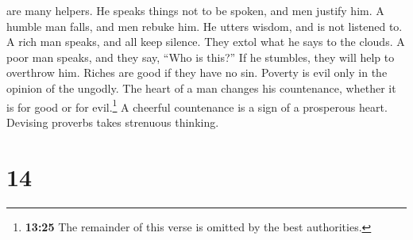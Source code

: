 are many helpers. He speaks things not to be spoken, and men justify
him. A humble man falls, and men rebuke him. He utters wisdom, and is
not listened to.  A rich man speaks, and all keep
silence. They extol what he says to the clouds. A poor man speaks, and
they say, ``Who is this?'' If he stumbles, they will help to overthrow
him.  Riches are good if they have no sin. Poverty is
evil only in the opinion of the ungodly.  The heart of a
man changes his countenance, whether it is for good or for
evil.\footnote{\textbf{13:25} The remainder of this verse is omitted by
  the best authorities.}  A cheerful countenance is a
sign of a prosperous heart. Devising proverbs takes strenuous thinking.

\hypertarget{section-11}{%
\section{14}\label{section-11}}

